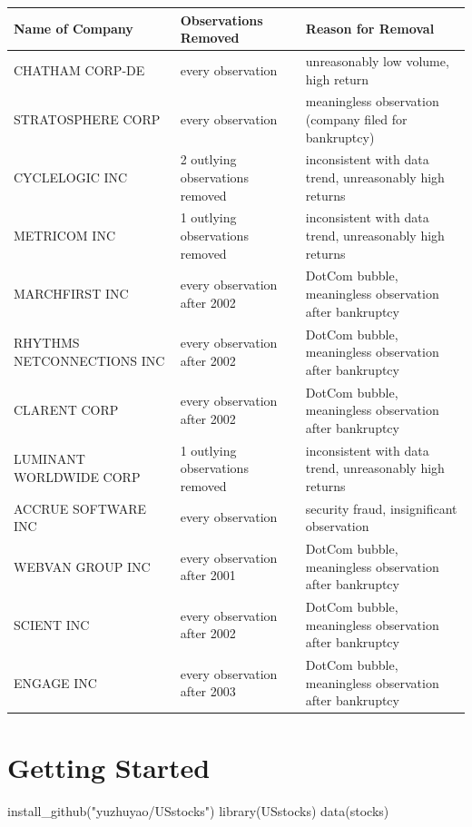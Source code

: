 \begin{tabular}{ | p{4cm} | p{4cm} | p{4cm} |}
    \hline
    Name of Company & Observations Removed & Reason for Removal \\ \hline
    CHATHAM CORP-DE & every observation & unreasonably low volume, high return \\ \hline
    STRATOSPHERE CORP & every observation & meaningless observation (company filed for bankruptcy)  \\ \hline
    CYCLELOGIC INC & 2 outlying observations removed & inconsistent with data trend, unreasonably high returns \\ \hline
    METRICOM INC & 1 outlying observations removed & inconsistent with data trend, unreasonably high returns \\ \hline
    MARCHFIRST INC & every observation after 2002 & DotCom bubble, meaningless observation after bankruptcy \\ \hline
    RHYTHMS NETCONNECTIONS INC & every observation after 2002 & DotCom bubble, meaningless observation after bankruptcy \\ \hline
    CLARENT CORP & every observation after 2002 & DotCom bubble, meaningless observation after bankruptcy \\ \hline
    LUMINANT WORLDWIDE CORP & 1 outlying observations removed & inconsistent with data trend, unreasonably high returns \\ \hline
    ACCRUE SOFTWARE INC & every observation & security fraud, insignificant observation \\ \hline
    WEBVAN GROUP INC & every observation after 2001 & DotCom bubble, meaningless observation after bankruptcy \\ \hline
    SCIENT INC & every observation after 2002 & DotCom bubble, meaningless observation after bankruptcy \\ \hline
    ENGAGE INC & every observation after 2003 & DotCom bubble, meaningless observation after bankruptcy \\ 
    \hline
\end{tabular}
\newline

\section{Getting Started}

\begin{example}
  install_github("yuzhuyao/USstocks")
  library(USstocks)
  data(stocks)
\end{example}

